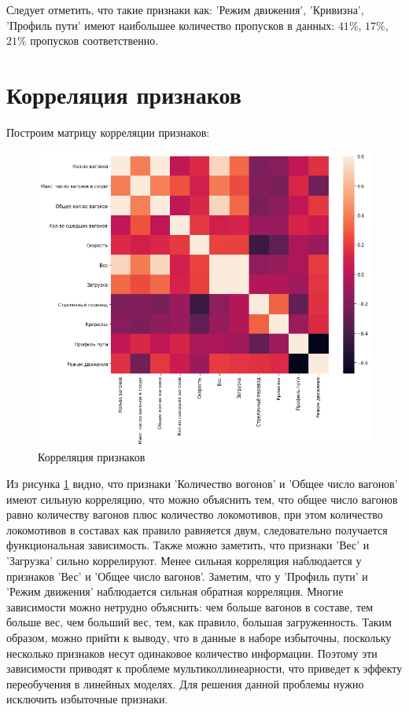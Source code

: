 Следует отметить, что такие признаки как: 'Режим движения', 'Кривизна', 'Профиль пути' имеют наибольшее количество пропусков в данных: $41\%$, $17\%$, $21\%$ пропусков соответственно.



\section{Корреляция признаков}

Построим матрицу корреляции признаков:

\begin{figure}[H]
\begin{center}
\includegraphics[width=0.85\linewidth]{src/img/df_corr}
\caption{Корреляция признаков}
\label{fig:df_corr}
\end{center}
\end{figure}

Из рисунка \ref{fig:df_corr} видно, что признаки 'Количество вогонов' и 'Общее число вагонов' имеют сильную корреляцию, что можно объяснить тем, что общее число вагонов равно количеству вагонов плюс количество локомотивов, при этом количество локомотивов в составах как правило равняется двум, следовательно получается функциональная зависимость. Также можно заметить, что признаки 'Вес' и 'Загрузка' сильно коррелируют. Менее сильная корреляция наблюдается у признаков 'Вес' и 'Общее число вагонов'. Заметим, что у 'Профиль пути' и 'Режим движения' наблюдается сильная обратная корреляция. Многие зависимости можно нетрудно объяснить: чем больше вагонов в составе, тем больше вес, чем больший вес, тем, как правило, большая загруженность. Таким образом, можно прийти к выводу, что в данные в наборе избыточны, поскольку несколько признаков несут одинаковое количество информации. Поэтому эти зависимости приводят к проблеме мультиколлинеарности, что приведет к эффекту переобучения в линейных моделях. Для решения данной проблемы нужно исключить избыточные признаки.



